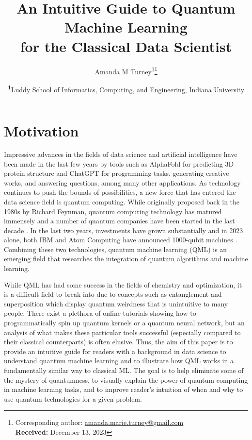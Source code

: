 \documentclass[
	a4paper, %
	10pt, %
	unnumberedsections, %
	twoside, %
]{LTJournalArticle}
\title{An Intuitive Guide to Quantum Machine Learning\\ for the Classical Data Scientist} %
\author{%
	Amanda M Turney\textsuperscript{1}\thanks{Corresponding author: \href{mailto:amanda.marie.turney@gmail.com.com}{amanda.marie.turney@gmail.com}\\ \textbf{Received:} December 13, 2023}
}
\date{\footnotesize\textsuperscript{\textbf{1}}Luddy School of Informatics, Computing, and Engineering, Indiana University\\}
\begin{document}
\maketitle %


\section{Motivation}

Impressive advances in the fields of data science and artificial intelligence have been made in the last few years by tools such as AlphaFold \autocite{jumper2021highly} 
for predicting 3D protein structure and ChatGPT \autocite{openai} for programming tasks, generating creative works, and answering questions, among many other applications. As technology 
continues to push the bounds of possibilities, a new force that has entered the data science field is quantum computing. While originally proposed back in the 1980s by Richard Feynman, 
quantum computing technology has matured immensely and a number of quantum companies have been started in the last decade \autocite{quantumhistory}. In the last two years, investments 
have grown substantially and in 2023 alone, both IBM and Atom Computing have announced 1000-qubit machines \autocite{atomcomputing, castelvecchiibm}. Combining these two technologies, 
quantum machine learning (QML) is an emerging field that researches the integration of quantum algorithms and machine learning.

While QML has had some success in the fields of chemistry and optimization, it is a difficult field to break into due to concepts such as entanglement and superposition which display 
quantum weirdness that is unintuitive to many people. There exist a plethora of online tutorials showing how to programmatically spin up quantum kernels or a quantum neural network, 
but an analysis of what makes these particular tools successful (especially compared to their classical counterparts) is often elusive. Thus, the aim of this paper is to provide an 
intuitive guide for readers with a background in data science to understand quantum machine learning and to illustrate how QML works in a fundamentally similar way to classical ML. 
The goal is to help eliminate some of the mystery of quantumness, to visually explain the power of quantum computing in machine learning tasks, and to improve reader's intuition of 
when and why to use quantum technologies for a given problem.
\end{document}
